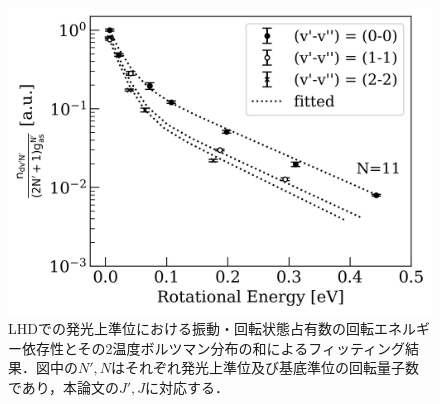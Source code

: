 \begin{figure}
    \centering
    \includegraphics[width=15cm]{pictures/ishihara-upper-boltzmann.png}
    \caption[LHDでの発光上準位における振動・回転状態占有数の回転エネルギー依存性とその2温度ボルツマン分布の和によるフィッティング結果\cite{ishihara}]{LHDでの発光上準位における振動・回転状態占有数の回転エネルギー依存性とその2温度ボルツマン分布の和によるフィッティング結果\cite{ishihara}．図中の$N', N$はそれぞれ発光上準位及び基底準位の回転量子数であり，本論文の$J', J$に対応する．}
    \label{fig:ishihara-upper-boltzmann}
\end{figure}

